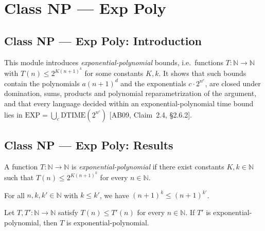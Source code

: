 \section{Class NP --- Exp Poly}
\subsection*{Class NP --- Exp Poly: Introduction}

This module introduces \emph{exponential-polynomial} bounds, i.e.\ functions
$T : \mathbb{N} \to \mathbb{N}$ with $T(n) \le 2^{K(n+1)^k}$ for some constants $K, k$.
It shows that such bounds contain the polynomials $a(n+1)^d$ and the exponentials
$c \cdot 2^{n^e}$, are closed under domination, sums, products and polynomial
reparametrization of the argument, and that every language decided within an
exponential-polynomial time bound lies in $\mathrm{EXP} = \bigcup_c \mathrm{DTIME}(2^{n^c})$
[AB09, Claim~2.4, \S2.6.2].

\subsection*{Class NP --- Exp Poly: Results}

\begin{definition}
\label{Complexity.ExpPoly}
\leanok
A function $T : \mathbb{N} \to \mathbb{N}$ is \emph{exponential-polynomial} if there exist
constants $K, k \in \mathbb{N}$ such that $T(n) \le 2^{K(n+1)^k}$ for every $n \in \mathbb{N}$.
\end{definition}

\begin{theorem}
\label{Complexity.pow_mono_deg}
\leanok
{}
For all $n,k,k'\in\mathbb{N}$ with $k\le k'$, we have $(n+1)^k\le(n+1)^{k'}$.
\end{theorem}

\begin{theorem}
\label{Complexity.ExpPoly.of_le}
\leanok
{}
Let $T,T':\mathbb{N}\to\mathbb{N}$ satisfy $T(n)\le T'(n)$ for every $n\in\mathbb{N}$.
If $T'$ is exponential-polynomial, then $T$ is exponential-polynomial.
\end{theorem}

